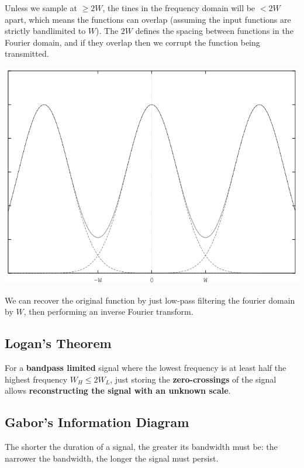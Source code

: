 \documentclass[a4paper, 11pt]{article}
\begin{document}
{{\begin{minipage}[t]{0.6\textwidth}
        Unless we sample at \(\geq 2W\), the tines in the frequency domain will be \(< 2W\) apart, which means the functions can overlap (assuming the input functions are strictly bandlimited to \(W\)). The \(2W\) defines the spacing between functions in the Fourier domain, and if they overlap then we corrupt the function being transmitted.
        \end{minipage}
        \hspace{3mm}
        \begin{minipage}[t]{0.35\textwidth}
        \vspace{0pt}
        \centering
        \includegraphics[width=\textwidth]{nyquist.png}
        \end{minipage}
        
        We can recover the original function by just low-pass filtering the fourier domain by \(W\), then performing an inverse Fourier transform.
    }
    \subsection*{Logan's Theorem}
    {
        For a \textbf{bandpass limited} signal where the lowest frequency is at least half the highest frequency \(W_H \leq 2W_L\), just storing the \textbf{zero-crossings} of the signal allows \textbf{reconstructing the signal with an unknown scale}.
    }
    \subsection*{Gabor's Information Diagram}
    {
        \begin{minipage}[t]{0.6\textwidth}
        \setlength{\parskip}{8pt}
        The shorter the duration of a signal, the greater its bandwidth must be: the narrower the bandwidth, the longer the signal must persist.


\end{minipage}}}
\end{document}
